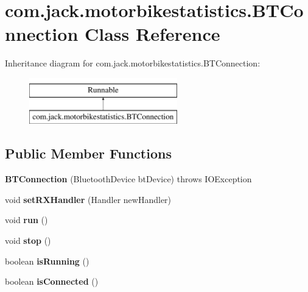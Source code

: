 \hypertarget{classcom_1_1jack_1_1motorbikestatistics_1_1_b_t_connection}{}\section{com.\+jack.\+motorbikestatistics.\+B\+T\+Connection Class Reference}
\label{classcom_1_1jack_1_1motorbikestatistics_1_1_b_t_connection}
Inheritance diagram for com.\+jack.\+motorbikestatistics.\+B\+T\+Connection\+:\begin{figure}[H]
\begin{center}
\leavevmode
\includegraphics[height=2.000000cm]{classcom_1_1jack_1_1motorbikestatistics_1_1_b_t_connection}
\end{center}
\end{figure}
\subsection*{Public Member Functions}
\begin{DoxyCompactItemize}
\item 
\mbox{\label{classcom_1_1jack_1_1motorbikestatistics_1_1_b_t_connection_a55a1c23b7bcf9dc097b10b62ce7828ba}} 
{\bfseries B\+T\+Connection} (Bluetooth\+Device bt\+Device)  throws I\+O\+Exception 
\item 
\mbox{\label{classcom_1_1jack_1_1motorbikestatistics_1_1_b_t_connection_aae8ee75e78f5beff98572bf3b13a60b8}} 
void {\bfseries set\+R\+X\+Handler} (Handler new\+Handler)
\item 
\mbox{\label{classcom_1_1jack_1_1motorbikestatistics_1_1_b_t_connection_ae4c6a0897742c6a7ccfb0b43d0d987da}} 
void {\bfseries run} ()
\item 
\mbox{\label{classcom_1_1jack_1_1motorbikestatistics_1_1_b_t_connection_a229363b085c81e1a42037075b675677d}} 
void {\bfseries stop} ()
\item 
\mbox{\label{classcom_1_1jack_1_1motorbikestatistics_1_1_b_t_connection_a17b07494b0e7cba2e550054d7b47e309}} 
boolean {\bfseries is\+Running} ()
\item 
\mbox{\label{classcom_1_1jack_1_1motorbikestatistics_1_1_b_t_connection_a22f33e46d9f460d78865d4c63b645357}} 
boolean {\bfseries is\+Connected} ()
\end{DoxyCompactItemize}
